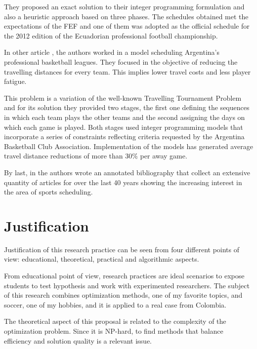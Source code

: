 \documentclass[11pt,letterpaper]{article}
\begin{document}
They proposed an exact solution to their integer programming formulation and also a heuristic approach based on three phases. The schedules obtained met the expectations of the FEF and one of them was adopted as the official schedule for the 2012 edition of the Ecuadorian professional football championship.

In other article \cite{basketball}, the authors worked in a model scheduling Argentina's professional basketball leagues. They focused in the objective of reducing the travelling distances for every team. This implies lower travel costs and less player fatigue.

This problem is a variation of the well-known Travelling Tournament Problem and for its solution they provided two stages, the first one defining the sequences in which each team plays the other teams and the second assigning the days on which each game is played. Both stages used integer programming models that incorporate a series of constraints reflecting criteria requested by the Argentina Basketball Club Association. Implementation of the models has generated average travel distance reductions of more than 30\% per away game.


By last, in \cite{bibliography} the authors wrote an annotated bibliography that collect an extensive quantity of articles for over the last 40 years showing the increasing interest in the area of sports scheduling.

\section{Justification}

Justification of this research practice can be seen from four different points of view: educational, theoretical, practical and algorithmic aspects.

From educational point of view, research practices are ideal scenarios to expose students to test hypothesis and work with experimented researchers. The subject of this research combines optimization methods, one of my favorite topics, and soccer, one of my hobbies, and it is applied to a real case from Colombia.

The theoretical aspect of this proposal is related to the complexity of the optimization problem. Since it is NP-hard, to find methods that balance efficiency and solution quality is a relevant issue.
\end{document}
